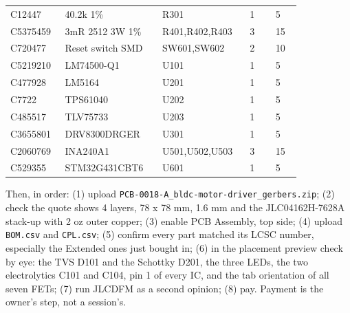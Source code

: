 \begin{hsblock}
{\begin{tabular}{L{0.14\linewidth} L{0.30\linewidth} L{0.24\linewidth} L{0.08\linewidth} L{0.08\linewidth}}
C12447 & 40.2k 1\% & R301 & 1 & 5 \\
C5375459 & 3mR 2512 3W 1\% & R401,R402,R403 & 3 & 15 \\
C720477 & Reset switch SMD & SW601,SW602 & 2 & 10 \\
C5219210 & LM74500-Q1 & U101 & 1 & 5 \\
C477928 & LM5164 & U201 & 1 & 5 \\
C7722 & TPS61040 & U202 & 1 & 5 \\
C485517 & TLV75733 & U203 & 1 & 5 \\
C3655801 & DRV8300DRGER & U301 & 1 & 5 \\
C2060769 & INA240A1 & U501,U502,U503 & 3 & 15 \\
C529355 & STM32G431CBT6 & U601 & 1 & 5 \\
\hline
\end{tabular}}
\end{hsblock}

Then, in order: (1) upload \texttt{PCB-0018-A\_bldc-motor-driver\_gerbers.zip};
(2) check the quote shows 4 layers, 78 x 78 mm, 1.6 mm and the
JLC04162H-7628A stack-up with 2 oz outer copper; (3) enable PCB Assembly, top
side; (4) upload \texttt{BOM.csv} and \texttt{CPL.csv}; (5) confirm every part
matched its LCSC number, especially the Extended ones just bought in; (6) in the
placement preview check by eye: the TVS D101 and the Schottky D201, the three
LEDs, the two electrolytics C101 and C104, pin 1 of every IC, and the tab
orientation of all seven FETs; (7) run JLCDFM as a second opinion; (8) pay.
Payment is the owner's step, not a session's.


